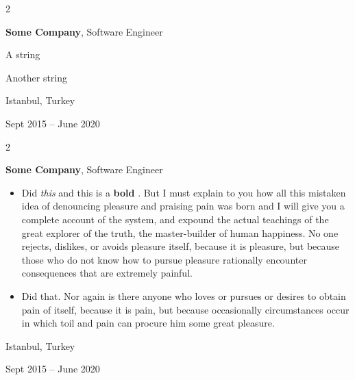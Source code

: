 \documentclass[10pt, letterpaper]{article}
\newenvironment{summary}{
    \begin{description}[
        topsep=0.10 cm,
        parsep=0.10 cm,
        partopsep=0pt,
        itemsep=0pt,
        leftmargin=0.4 cm + 10pt
    ]
}{
    \end{description}
} %
\newenvironment{highlights}{
    \begin{itemize}[
        topsep=0.10 cm,
        parsep=0.10 cm,
        partopsep=0pt,
        itemsep=0pt,
        leftmargin=0.4 cm + 10pt
    ]
}{
    \end{itemize}
} %
\newenvironment{twocolentry}[2][]{
    \onecolentry
    \def\secondColumn{#2}
    \setcolumnwidth{\fill, 4.5 cm}
    \begin{paracol}{2}
}{
    \switchcolumn \raggedleft \secondColumn
    \end{paracol}
    \endonecolentry
} %
\let\hrefWithoutArrow\href
\renewcommand{\href}[2]{\hrefWithoutArrow{#1}{\ifthenelse{\equal{#2}{}}{ }{#2 }\raisebox{.15ex}{\footnotesize \faExternalLink*}}}
\begin{document}
        \vspace{0.2 cm}

        \begin{twocolentry}{
            Istanbul, Turkey

        Sept 2015 – June 2020
        }
            \textbf{Some \textnormal{Company}}, Software Engineer
            \begin{summary}
                \item A string
                \item Another string
            \end{summary}
        \end{twocolentry}


        \vspace{0.2 cm}

        \begin{twocolentry}{
            Istanbul, Turkey

        Sept 2015 – June 2020
        }
            \textbf{Some \textnormal{Company}}, Software Engineer
            \begin{highlights}
                \item Did \textit{this} and this is a \textbf{bold} \href{https://example.com}{link}. But I must explain to you how all this mistaken idea of denouncing pleasure and praising pain was born and I will give you a complete account of the system, and expound the actual teachings of the great explorer of the truth, the master-builder of human happiness. No one rejects, dislikes, or avoids pleasure itself, because it is pleasure, but because those who do not know how to pursue pleasure rationally encounter consequences that are extremely painful.
                \item Did that. Nor again is there anyone who loves or pursues or desires to obtain pain of itself, because it is pain, but because occasionally circumstances occur in which toil and pain can procure him some great pleasure.
            \end{highlights}
        \end{twocolentry}


        \vspace{0.2 cm}
\end{document}
